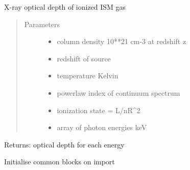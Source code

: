 \documentclass[letterpaper,10pt,english]{sphinxmanual}
\begin{document}

\begin{fulllineitems}
\label{\detokenize{astro_functions:astro.iismtau}}
X-ray optical depth of ionized ISM gas
\begin{quote}\begin{description}
\item[{Parameters}] \leavevmode\begin{itemize}
\item {} 
 \textendash{} column density 10**21 cm-3 at redshift z

\item {} 
 \textendash{} redshift of source

\item {} 
 \textendash{} temperature Kelvin

\item {} 
 \textendash{} powerlaw index of continuum spectrum

\item {} 
 \textendash{} ionization state = L/nR\textasciicircum{}2

\item {} 
 \textendash{} array of photon energies keV

\end{itemize}

\end{description}\end{quote}

Returns:  optical depth for each energy

\end{fulllineitems}


\begin{fulllineitems}
\label{\detokenize{astro_functions:astro.init}}
Initialise common blocks on import

\end{fulllineitems}
\end{document}
